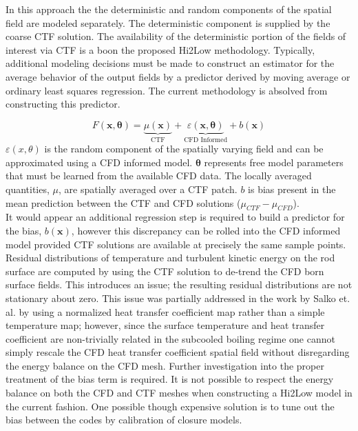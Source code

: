 In this approach the the deterministic and random components of the spatial field are modeled separately.  The deterministic component is supplied by the coarse CTF solution.
The availability of the deterministic portion of the fields of interest via CTF is a boon the proposed Hi2Low methodology.  Typically, additional modeling decisions must be made to construct an estimator for the average behavior of the output fields by a predictor derived by moving average or ordinary least squares regression.  The current methodology is absolved from constructing this predictor.

\begin{equation}
    F(\mathbf x, \mathbf \theta) = \underbrace{\mu(\mathbf{x})}_\text{CTF} + \underbrace{\varepsilon({\mathbf x, \mathbf \theta})}_\text{CFD Informed} + b(\mathbf{x})
\end{equation}
$\varepsilon(x, \theta)$ is the random component of the spatially varying field and can be approximated using a CFD informed model.  $\mathbf \theta$ represents free model parameters that must be learned from the available CFD data.
 The locally averaged quantities, $\mu$, are spatially averaged over a CTF patch.
$b$ is bias present in the mean prediction between the CTF and CFD solutions ($\mu_{CTF} - \mu_{CFD}$). \\

It would appear an additional regression step is required to build a predictor for the bias, $b(\mathbf{x})$, however this discrepancy can be rolled into the
CFD informed model provided CTF solutions are available at precisely the same sample points.
Residual distributions of temperature and turbulent kinetic energy on the rod surface are computed by using the CTF solution to de-trend the CFD born surface fields.  This introduces an issue; the resulting residual distributions are not stationary about zero.   This issue was partially addressed in the work by Salko et. al. by using a normalized heat transfer coefficient map rather than a simple temperature map; however, since the surface temperature and heat transfer coefficient are non-trivially related in the subcooled boiling regime one cannot simply rescale the CFD heat transfer coefficient spatial field without disregarding the energy balance on the CFD mesh.  Further investigation into the proper treatment of the bias term is required.  It is not possible to respect the energy balance on both the CFD and CTF meshes when constructing a Hi2Low model in the current fashion.  One possible though expensive solution is to tune out the bias between the codes by calibration of closure models.

